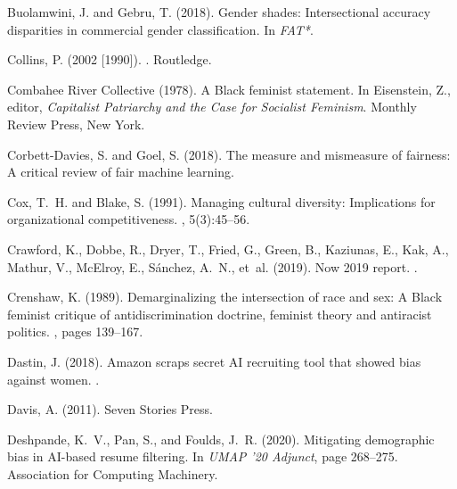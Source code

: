 \documentclass[11pt,dvipdfm]{article}
\begin{document}
\begin{thebibliography}{}
	Buolamwini, J. and Gebru, T. (2018).
	\newblock Gender shades: Intersectional accuracy disparities in commercial
	gender classification.
	\newblock In {\em FAT*}.
	
	Collins, P. (2002 [1990]).
	.
	\newblock Routledge.
	
	{Combahee River Collective} (1978).
	\newblock A {B}lack feminist statement.
	\newblock In Eisenstein, Z., editor, {\em Capitalist Patriarchy and the Case
		for Socialist Feminism}. Monthly Review Press, New York.
	
	Corbett-Davies, S. and Goel, S. (2018).
	\newblock The measure and mismeasure of fairness: A critical review of fair
	machine learning.
	
	Cox, T.~H. and Blake, S. (1991).
	\newblock Managing cultural diversity: Implications for organizational
	competitiveness.
	, 5(3):45--56.
	
	Crawford, K., Dobbe, R., Dryer, T., Fried, G., Green, B., Kaziunas, E., Kak,
	A., Mathur, V., McElroy, E., S{\'a}nchez, A.~N., et~al. (2019).
	 {N}ow 2019 report.
	.
	
	Crenshaw, K. (1989).
	\newblock Demarginalizing the intersection of race and sex: A {B}lack feminist
	critique of antidiscrimination doctrine, feminist theory and antiracist
	politics.
	, pages 139--167.
	
	Dastin, J. (2018).
	\newblock Amazon scraps secret {AI} recruiting tool that showed bias against
	women.
	.
	
	Davis, A. (2011).
	\newblock Seven Stories Press.
	
	Deshpande, K.~V., Pan, S., and Foulds, J.~R. (2020).
	\newblock Mitigating demographic bias in {AI}-based resume filtering.
	\newblock In {\em UMAP '20 Adjunct}, page 268–275. Association for Computing
	Machinery.
	

\end{thebibliography}
\end{document}
